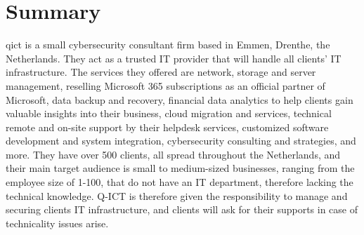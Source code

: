 \chapter*{Summary}


\acrshort{qict} is a small cybersecurity consultant firm based in Emmen, Drenthe, the Netherlands. They act as a trusted IT
provider that will handle all clients' IT infrastructure. The services they offered are network, storage and server management,
reselling Microsoft 365 subscriptions as an official partner of Microsoft, data backup and recovery, financial data analytics to
help clients gain valuable insights into their business, cloud migration and services, technical remote and on-site support by
their helpdesk services, customized software development and system integration, cybersecurity consulting and strategies, and
more. They have over 500 clients, all spread throughout the Netherlands, and their main target audience is small to medium-sized
businesses, ranging from the employee size of 1-100, that do not have an IT department, therefore lacking the technical knowledge. Q-ICT
is therefore given the responsibility to manage and securing clients IT infrastructure, and clients will ask for their supports in
case of technicality issues arise.

